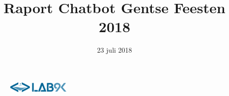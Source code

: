 \documentclass[11pt, letterpaper, oneside]{article}
\title{Raport Chatbot Gentse Feesten 2018}
\author{}
\date{23 juli 2018}
\begin{document}
	\begin{figure}
			\includegraphics[width=0.27\textwidth,keepaspectratio]{figuren/logo} %
	\end{figure}
	\vspace*{0.35cm}
	
	\noindent
	\fontsize{30pt}{28pt}\selectfont\textcolor{priColour}{\textbf{\@title}}\newline
	
	\fontsize{11pt}{15pt}\selectfont
	
	
\end{document}
